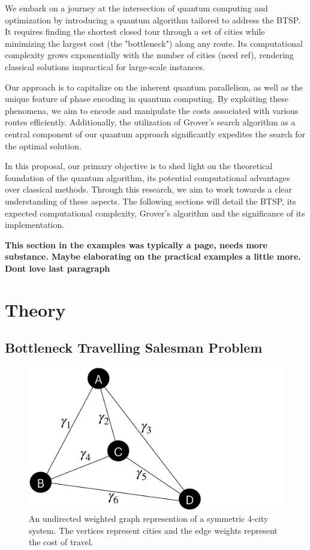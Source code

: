 \documentclass[twocolumn,showpacs,preprintnumbers,amsmath,amssymb]{revtex4}
\begin{document}
		We embark on a journey at the intersection of quantum computing and optimization by introducing a quantum algorithm tailored to address the BTSP. It requires finding the shortest closed tour through a set of cities while minimizing the largest cost (the "bottleneck") along any route. Its computational complexity grows exponentially with the number of cities (need ref), rendering classical solutions impractical for large-scale instances.
		
		Our approach is to capitalize on the inherent quantum parallelism, as well as the unique feature of phase encoding in quantum computing. By exploiting these phenomena, we aim to encode and manipulate the costs associated with various routes efficiently. Additionally, the utilization of Grover's search algorithm as a central component of our quantum approach significantly expedites the search for the optimal solution.
		
		In this proposal, our primary objective is to shed light on the theoretical foundation of the quantum algorithm, its potential computational advantages over classical methods. Through this research, we aim to work towards a clear understanding of these aspects. The following sections will detail the BTSP, its expected computational complexity, Grover's algorithm and the significance of its implementation.
		
		\textbf{This section in the examples was typically a page, needs more substance. Maybe elaborating on the practical examples a little more. Dont love last paragraph} 
		
		
		\section{Theory}
		
		\subsection{Bottleneck Travelling Salesman Problem}
		
		\begin{figure}[!h]
			\centering
			\includegraphics[trim={0 0 21.9cm 0},clip, width=0.7 \linewidth]{"graphics/4-city"}
			\caption{An undirected weighted graph represention of a  symmetric 4-city system.  The vertices represent cities and the edge weights represent the cost of travel. }
			\label{fig:4-city-graphic}
		\end{figure}		
		
\end{document}
